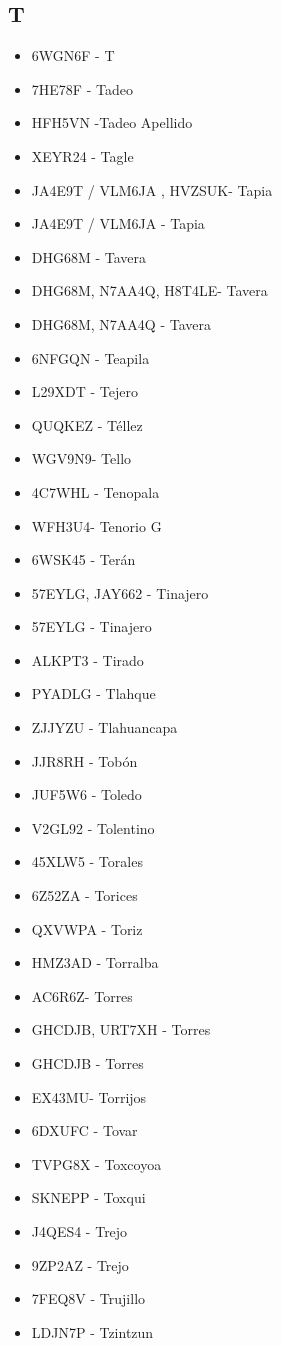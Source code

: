 \subsection*{T}
\begin{itemize}[leftmargin=*,nosep]
\item 6WGN6F - T
\item 7HE78F  -  Tadeo
\item HFH5VN -Tadeo Apellido
\item XEYR24 - Tagle
\item JA4E9T / VLM6JA , HVZSUK- Tapia
\item JA4E9T / VLM6JA  -  Tapia
\item DHG68M - Tavera
\item DHG68M, N7AA4Q, H8T4LE- Tavera
\item DHG68M, N7AA4Q - Tavera
\item 6NFGQN - Teapila
\item L29XDT - Tejero
\item QUQKEZ  -  Téllez
\item WGV9N9- Tello
\item 4C7WHL - Tenopala
\item WFH3U4- Tenorio G
\item 6WSK45  -  Terán
\item 57EYLG, JAY662 - Tinajero
\item 57EYLG - Tinajero
\item ALKPT3  -  Tirado
\item PYADLG -  Tlahque
\item ZJJYZU - Tlahuancapa
\item JJR8RH - Tobón
\item JUF5W6 - Toledo
\item V2GL92 - Tolentino
\item 45XLW5 - Torales
\item 6Z52ZA - Torices
\item QXVWPA - Toriz
\item HMZ3AD  -  Torralba
\item AC6R6Z- Torres
\item GHCDJB, URT7XH - Torres
\item GHCDJB  -  Torres
\item EX43MU- Torrijos
\item 6DXUFC  -  Tovar
\item TVPG8X - Toxcoyoa
\item SKNEPP - Toxqui
\item J4QES4 - Trejo
\item 9ZP2AZ - Trejo
\item 7FEQ8V - Trujillo
\item LDJN7P - Tzintzun
\end{itemize}

